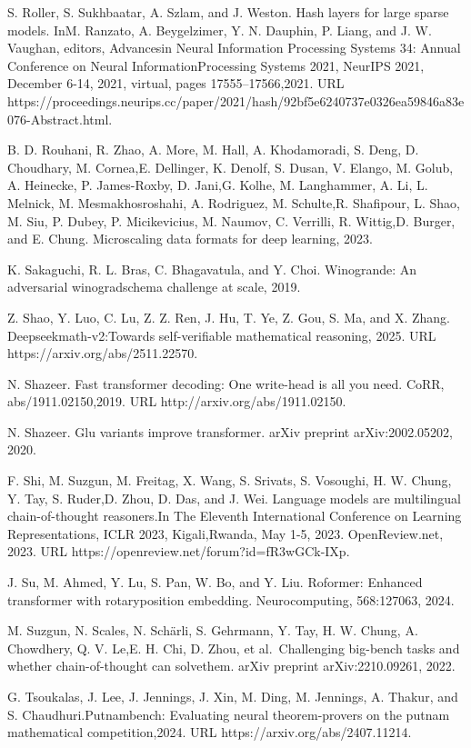 \documentclass[
  10
]{article}
\begin{document}
S. Roller, S. Sukhbaatar, A. Szlam, and J. Weston. Hash layers for large
sparse models. InM. Ranzato, A. Beygelzimer, Y. N. Dauphin, P. Liang,
and J. W. Vaughan, editors, Advancesin Neural Information Processing
Systems 34: Annual Conference on Neural InformationProcessing Systems
2021, NeurIPS 2021, December 6-14, 2021, virtual, pages
17555--17566,2021. URL
https://proceedings.neurips.cc/paper/2021/hash/92bf5e6240737e0326ea59846a83e076-Abstract.html.

B. D. Rouhani, R. Zhao, A. More, M. Hall, A. Khodamoradi, S. Deng, D.
Choudhary, M. Cornea,E. Dellinger, K. Denolf, S. Dusan, V. Elango, M.
Golub, A. Heinecke, P. James-Roxby, D. Jani,G. Kolhe, M. Langhammer, A.
Li, L. Melnick, M. Mesmakhosroshahi, A. Rodriguez, M. Schulte,R.
Shafipour, L. Shao, M. Siu, P. Dubey, P. Micikevicius, M. Naumov, C.
Verrilli, R. Wittig,D. Burger, and E. Chung. Microscaling data formats
for deep learning, 2023.

K. Sakaguchi, R. L. Bras, C. Bhagavatula, and Y. Choi. Winogrande: An
adversarial winogradschema challenge at scale, 2019.

Z. Shao, Y. Luo, C. Lu, Z. Z. Ren, J. Hu, T. Ye, Z. Gou, S. Ma, and X.
Zhang. Deepseekmath-v2:Towards self-verifiable mathematical reasoning,
2025. URL https://arxiv.org/abs/2511.22570.

N. Shazeer. Fast transformer decoding: One write-head is all you need.
CoRR, abs/1911.02150,2019. URL http://arxiv.org/abs/1911.02150.

N. Shazeer. Glu variants improve transformer. arXiv preprint
arXiv:2002.05202, 2020.

F. Shi, M. Suzgun, M. Freitag, X. Wang, S. Srivats, S. Vosoughi, H. W.
Chung, Y. Tay, S. Ruder,D. Zhou, D. Das, and J. Wei. Language models are
multilingual chain-of-thought reasoners.In The Eleventh International
Conference on Learning Representations, ICLR 2023, Kigali,Rwanda, May
1-5, 2023. OpenReview.net, 2023. URL
https://openreview.net/forum?id=fR3wGCk-IXp.

J. Su, M. Ahmed, Y. Lu, S. Pan, W. Bo, and Y. Liu. Roformer: Enhanced
transformer with rotaryposition embedding. Neurocomputing, 568:127063,
2024.

M. Suzgun, N. Scales, N. Schärli, S. Gehrmann, Y. Tay, H. W. Chung, A.
Chowdhery, Q. V. Le,E. H. Chi, D. Zhou, et al.~Challenging big-bench
tasks and whether chain-of-thought can solvethem. arXiv preprint
arXiv:2210.09261, 2022.

G. Tsoukalas, J. Lee, J. Jennings, J. Xin, M. Ding, M. Jennings, A.
Thakur, and S. Chaudhuri.Putnambench: Evaluating neural theorem-provers
on the putnam mathematical competition,2024. URL
https://arxiv.org/abs/2407.11214.
\end{document}
